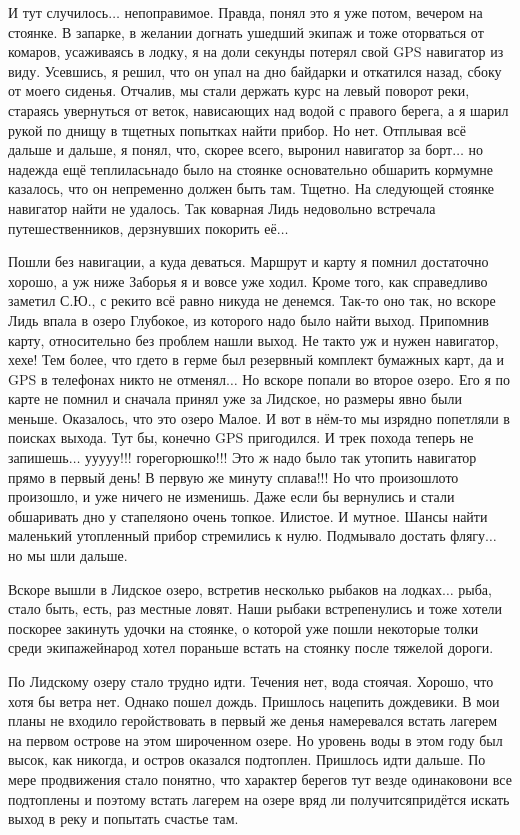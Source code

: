 И тут случилось$\ldots$ непоправимое. Правда, понял это я уже потом, вечером на стоянке. В запарке, в желании догнать ушедший экипаж и тоже оторваться от комаров, усаживаясь в лодку, я на доли секунды потерял свой GPS навигатор из виду. Усевшись, я решил, что он упал на дно байдарки и откатился назад, сбоку от моего сиденья. Отчалив, мы стали держать курс на левый поворот реки, стараясь увернуться от веток, нависающих над водой с правого берега, а я шарил рукой по днищу в тщетных попытках найти прибор. Но нет. Отплывая всё дальше и дальше, я понял, что, скорее всего, выронил навигатор за борт$\ldots$ но надежда ещё теплилась\mdash надо было на стоянке основательно обшарить корму\mdash мне казалось, что он непременно должен быть там. Тщетно. На следующей стоянке навигатор найти не удалось. Так коварная Лидь недовольно встречала путешественников, дерзнувших покорить её$\ldots$

Пошли без навигации, а куда деваться. Маршрут и карту я помнил достаточно хорошо, а уж ниже Заборья я и вовсе уже ходил. Кроме того, как справедливо заметил С.Ю., с реки\sdash то всё равно никуда не денемся. Так-то оно так, но вскоре Лидь впала в озеро Глубокое, из которого надо было найти выход. Припомнив карту, относительно без проблем нашли выход. Не так\sdash то уж и нужен навигатор, хе\sdash хе! Тем более, что где\sdash то в герме был резервный комплект бумажных карт, да и GPS в телефонах никто не отменял$\ldots$ Но вскоре попали во второе озеро. Его я по карте не помнил и сначала принял уже за Лидское, но размеры явно были меньше. Оказалось, что это озеро Малое. И вот в нём-то мы изрядно попетляли в поисках выхода. Тут бы, конечно GPS пригодился. И трек похода теперь не запишешь$\ldots$ у\sdash у\sdash у\sdash у\sdash у!!! горе\sdash горюшко!!! Это ж надо было так утопить навигатор прямо в первый день! В первую же минуту сплава!!! Но что произошло\mdash то произошло, и уже ничего не изменишь. Даже если бы вернулись и стали обшаривать дно у стапеля\mdash оно очень топкое. Илистое. И мутное. Шансы найти маленький утопленный прибор стремились к нулю. Подмывало достать флягу$\ldots$ но мы шли дальше.

Вскоре вышли в Лидское озеро, встретив несколько рыбаков на лодках$\ldots$ рыба, стало быть, есть, раз местные ловят. Наши рыбаки встрепенулись и тоже хотели поскорее закинуть удочки на стоянке, о которой уже пошли некоторые толки среди экипажей\mdash народ хотел пораньше встать на стоянку после тяжелой дороги. 

По Лидскому озеру стало трудно идти. Течения нет, вода стоячая. Хорошо, что хотя бы ветра нет. Однако пошел дождь. Пришлось нацепить дождевики. В мои планы не входило геройствовать в первый же день\mdash я намеревался встать лагерем на первом острове на этом широченном озере. Но уровень воды в этом году был высок, как никогда, и остров оказался подтоплен. Пришлось идти дальше. По мере продвижения стало понятно, что характер берегов тут везде одинаков\mdash они все подтоплены и поэтому встать лагерем на озере вряд ли получится\mdash придётся искать выход в реку и попытать счастье там. 

